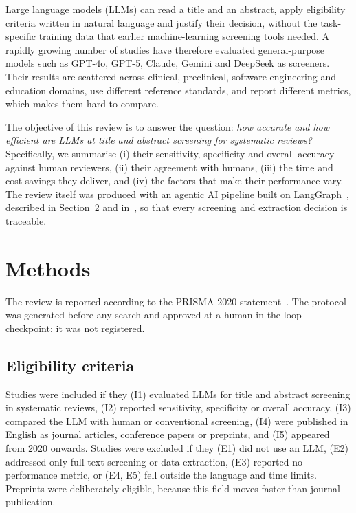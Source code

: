 \documentclass[12pt,a4paper]{article}
\begin{document}
Large language models (LLMs) can read a title and an abstract, apply eligibility criteria
written in natural language and justify their decision, without the task-specific training
data that earlier machine-learning screening tools needed. A rapidly growing number of studies
have therefore evaluated general-purpose models such as GPT-4o, GPT-5, Claude, Gemini and
DeepSeek as screeners. Their results are scattered across clinical, preclinical, software
engineering and education domains, use different reference standards, and report different
metrics, which makes them hard to compare.

The objective of this review is to answer the question: \emph{how accurate and how efficient
are LLMs at title and abstract screening for systematic reviews?} Specifically, we summarise
(i) their sensitivity, specificity and overall accuracy against human reviewers, (ii) their
agreement with humans, (iii) the time and cost savings they deliver, and (iv) the factors
that make their performance vary. The review itself was produced with an agentic AI pipeline built on
LangGraph~\cite{langgraph}, described in Section~2 and in~\cite{repo}, so that every screening and extraction decision is
traceable.

\section{Methods}
The review is reported according to the PRISMA 2020 statement~\cite{prisma}. The protocol was
generated before any search and approved at a human-in-the-loop checkpoint; it was not
registered.

\subsection{Eligibility criteria}
Studies were included if they (I1) evaluated LLMs for title and abstract screening in
systematic reviews, (I2) reported sensitivity, specificity or overall accuracy, (I3) compared
the LLM with human or conventional screening, (I4) were published in English as journal
articles, conference papers or preprints, and (I5) appeared from 2020 onwards. Studies were
excluded if they (E1) did not use an LLM, (E2) addressed only full-text screening or data
extraction, (E3) reported no performance metric, or (E4, E5) fell outside the language and
time limits. Preprints were deliberately eligible, because this field moves faster than
journal publication.
\end{document}
